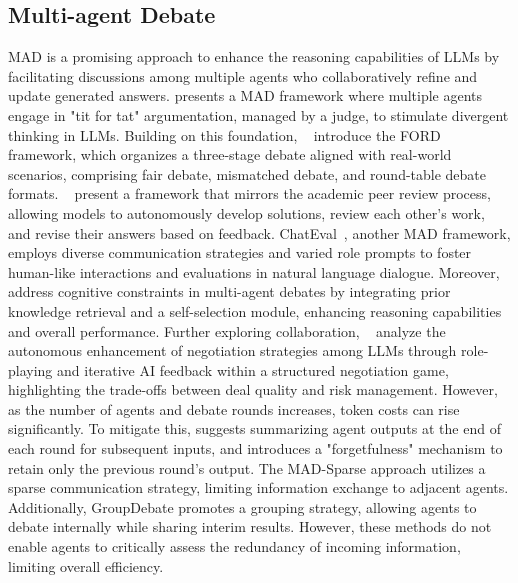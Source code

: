\subsection{Multi-agent Debate}
%
MAD is a promising approach to enhance the reasoning capabilities of LLMs by facilitating discussions among multiple agents who collaboratively refine and update generated answers. 
%
\cite{liang2023encouraging} presents a MAD framework where multiple agents engage in "tit for tat" argumentation, managed by a judge, to stimulate divergent thinking in LLMs.
%
Building on this foundation, ~\cite{xiong2023examining} introduce the FORD framework, which organizes a three-stage debate aligned with real-world scenarios, comprising fair debate, mismatched debate, and round-table debate formats.
%
~\cite{xu2023toward} present a framework that mirrors the academic peer review process, allowing models to autonomously develop solutions, review each other’s work, and revise their answers based on feedback. 
ChatEval~\citep{chan2023chateval}, another MAD framework, employs diverse communication strategies and varied role prompts to foster human-like interactions and evaluations in natural language dialogue. 
Moreover, ~\cite{wang2023apollo} address cognitive constraints in multi-agent debates by integrating prior knowledge retrieval and a self-selection module, enhancing reasoning capabilities and overall performance.
%
Further exploring collaboration, ~\cite{fu2023improving} analyze the autonomous enhancement of negotiation strategies among LLMs through role-playing and iterative AI feedback within a structured negotiation game, highlighting the trade-offs between deal quality and risk management.
However, as the number of agents and debate rounds increases, token costs can rise significantly. 
To mitigate this, \cite{du2023improving} suggests summarizing agent outputs at the end of each round for subsequent inputs, and \cite{sun2023corex} introduces a "forgetfulness" mechanism to retain only the previous round's output. The MAD-Sparse approach \cite{li2024improving} utilizes a sparse communication strategy, limiting information exchange to adjacent agents. Additionally, GroupDebate \cite{liu2024GroupDebate} promotes a grouping strategy, allowing agents to debate internally while sharing interim results. However, these methods do not enable agents to critically assess the redundancy of incoming information, limiting overall efficiency.
